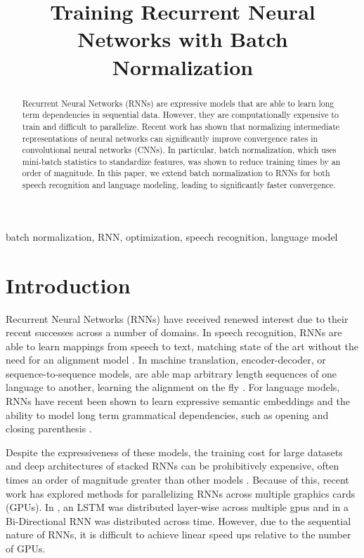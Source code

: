 \documentclass{article}
\title{Training Recurrent Neural Networks with Batch Normalization}
\begin{document}
%
\maketitle
%
\begin{abstract}
Recurrent Neural Networks (RNNs) are expressive models that are able to learn
long term dependencies in sequential data. However, they are computationally
expensive to train and difficult to parallelize. Recent work has shown that normalizing
intermediate representations of neural networks can significantly improve convergence
rates in convolutional neural networks (CNNs). In particular, batch normalization, which
uses mini-batch statistics to standardize features, was shown to reduce training times by
an order of magnitude. In this paper,
we extend batch normalization to RNNs for both speech recognition and language
modeling, leading to significantly faster convergence.
\end{abstract}
%
\begin{keywords}
batch normalization, RNN, optimization, speech recognition, language model
\end{keywords}
%
\section{Introduction}

Recurrent Neural Networks (RNNs) have received renewed interest due to their recent successes across a number of domains. In speech recognition, RNNs are able to learn mappings from speech to text, matching state of the art without the need for an alignment model \citep{graves2013speech}. In machine translation, encoder-decoder, or sequence-to-sequence models, are able map arbitrary length sequences of one language to another, learning the alignment on the fly \citep{sutskever2014sequence}. For language models, RNNs have recent been shown to learn expressive semantic embeddings and the ability to model long term grammatical dependencies, such as opening and closing parenthesis \citep{mikolov2012thesis}.

Despite the expressiveness of these models, the training cost for large datasets and deep architectures of stacked RNNs can be prohibitively expensive, often times an order of magnitude greater than other models \citep{williams2015scaling}. Because of this, recent work has explored methods for parallelizing RNNs across multiple graphics cards (GPUs). In \citep{sutskever2014sequence}, an LSTM was distributed layer-wise across multiple gpus and in \citep{hannun2014deepspeech} a Bi-Directional RNN was distributed across time. However, due to the sequential nature of RNNs, it is difficult to achieve linear speed ups relative to the number of GPUs.
\end{document}
